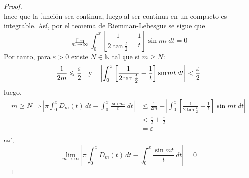 \documentclass[12pt]{report}
\theoremstyle{largebreak}
\renewcommand{\leq}{\ensuremath{\leqslant}}
\renewcommand{\geq}{\ensuremath{\geqslant}}
\newcommand\abs[1]{\ensuremath{\left|#1\right|}}
\begin{document}
\begin{proof}
\begin{equation*}
        \end{equation*}
        hace que la función sea continua, luego al ser continua en un compacto es integrable. Así, por el teorema de Riemman-Lebesgue se sigue que
        \begin{equation*}
            \lim_{ m\rightarrow\infty}\int_{0}^{x}\left[\frac{1}{2\tan\frac{t}{2}}-\frac{1}{t}\right]\sin mt\:dt=0
        \end{equation*}
        Por tanto, para $\varepsilon>0$ existe $N\in\mathbb{N}$ tal que si $m\geq N$:
        \begin{equation*}
            \frac{1}{2m}\leq\frac{\varepsilon}{2}\quad\textup{y}\quad\abs{\int_{0}^{x}\left[\frac{1}{2\tan\frac{t}{2}}-\frac{1}{t}\right]\sin mt\:dt}<\frac{\varepsilon}{2}
        \end{equation*}
        luego,
        \begin{equation*}
            \begin{split}
                m\geq N\Rightarrow\abs{\pi\int_0^x D_m(t)\:dt-\int_{0}^{x}\frac{\sin mt}{t}\:dt}&\leq\frac{1}{2m}+\abs{\int_{0}^{x}\left[\frac{1}{2\tan\frac{t}{2}}-\frac{1}{t}\right]\sin mt\:dt}\\
                &<\frac{\varepsilon}{2}+\frac{\varepsilon}{2}\\
                &=\varepsilon\\
            \end{split}
        \end{equation*}
        así,
        \begin{equation*}
            \lim_{ m\rightarrow\infty}\abs{\pi\int_0^x D_m(t)\:dt-\int_{0}^{x}\frac{\sin mt}{t}\:dt}=0
        \end{equation*}


\end{proof}
\end{document}
